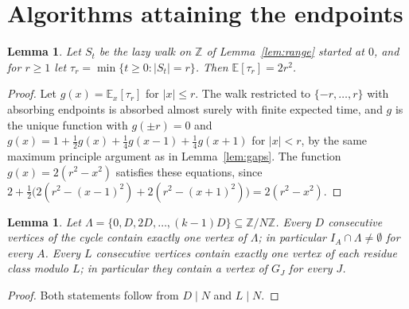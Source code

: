 \documentclass{amsart}
\theoremstyle{plain}
\newtheorem{lemma}[theorem]{Lemma}
\theoremstyle{definition}
\theoremstyle{remark}
\newcommand{\Z}{\mathbb{Z}}
\newcommand{\E}{\mathbb{E}}
\begin{document}
\section{Algorithms attaining the endpoints}\label{sec:algorithms}

\begin{lemma}\label{lem:exit}
Let $S_t$ be the lazy walk on $\Z$ of Lemma~\ref{lem:range} started at $0$, and for $r\ge 1$ let $\tau_r=\min\{t\ge 0:|S_t|=r\}$. Then $\E[\tau_r]=2r^2$.
\end{lemma}

\begin{proof}
Let $g(x)=\E_x[\tau_r]$ for $|x|\le r$. The walk restricted to $\{-r,\dots,r\}$ with absorbing endpoints is absorbed almost surely with finite expected time, and $g$ is the unique function with $g(\pm r)=0$ and $g(x)=1+\frac12 g(x)+\frac14 g(x-1)+\frac14 g(x+1)$ for $|x|<r$, by the same maximum principle argument as in Lemma~\ref{lem:gaps}. The function $g(x)=2(r^2-x^2)$ satisfies these equations, since $2+\frac12\bigl(2(r^2-(x-1)^2)+2(r^2-(x+1)^2)\bigr)=2(r^2-x^2)$.
\end{proof}

\begin{lemma}\label{lem:net}
Let $\Lambda=\{0,D,2D,\dots,(k-1)D\}\subseteq\Z/N\Z$. Every $D$ consecutive vertices of the cycle contain exactly one vertex of $\Lambda$; in particular $I_A\cap\Lambda\neq\emptyset$ for every $A$. Every $L$ consecutive vertices contain exactly one vertex of each residue class modulo $L$; in particular they contain a vertex of $G_J$ for every $J$.
\end{lemma}

\begin{proof}
Both statements follow from $D\mid N$ and $L\mid N$.
\end{proof}
\end{document}
